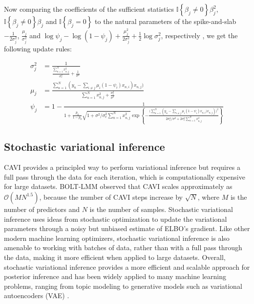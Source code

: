 %
Now comparing the coefficients of the sufficient statistics $\mathbb{I}\left\{\beta_j \ne 0\right\} \beta_j^2$, $\mathbb{I}\left\{\beta_j \ne 0\right\} \beta_j$ and $\mathbb{I}\left\{\beta_j = 0\right\}$ to the natural parameters of the spike-and-slab $-\frac{1}{2\sigma_j^2}$, $\frac{\mu_j}{\sigma_j^2}$ and $\log \psi_j - \log (1-\psi_j) + \frac{\mu_j^2}{2\sigma_j^2} + \frac{1}{2}\log \sigma_j^2$, respectively \cite{spence2020flexible}, we get the following update rules:

\begin{align}
    \sigma_j^2 &= \frac{1}{\frac{\sum_{n=1}^N x^2_{n,j}}{ \sigma_e^2} + \frac{1}{\sigma^2}} \nonumber \\
    \mu_j &= \frac{\sum_{n=1}^N (y_n - \sum_{i \ne j} \mu_i (1- \psi_i) x_{n,i}) x_{n,j})}{\sum_{n=1}^N x^2_{n,j} + \frac{\sigma_e^2}{\sigma^2}} \nonumber \\
    \psi_j &= 1 - \frac{1}{1 + \frac{p_0}{1-p_0}\sqrt{1 + \sigma^2 / \sigma_e^2 \sum_{n=1}^N x^2_{n,j} }  \exp\left\{ - \frac{\Big( \sum_{n=1}^N \left( y_n - \sum_{i \ne j} \mu_i (1- \psi_i) x_{n,i}) x_{n,j} \right) \Big)^2}{2\sigma_e^4/ \sigma^2 + 2\sigma_e^2\sum_{n=1}^N x^2_{n,j}}\right\}}
\label{eq:cavi_2_update_psi}
\end{align}

\subsection{Stochastic variational inference}
\label{sec:ch4-theory-svi}
%
CAVI provides a principled way to perform variational inference but requires a full pass through the data for each iteration, which is computationally expensive for large datasets.
%
BOLT-LMM \cite{loh2015efficient} \cite{loh2018mixed} observed that CAVI scales approximately as $\mathcal{O}(MN^{1.5})$, because the number of CAVI steps increase by $\sqrt{N}$, where $M$ is the number of predictors and $N$ is the number of samples.
%
Stochastic variational inference \cite{hoffman2013stochastic} uses ideas from stochastic optimization \cite{robbins1951stochastic} to update the variational parameters through a noisy but unbiased estimate of ELBO's gradient.
%
Like other modern machine learning optimizers, stochastic variational inference is also amenable to working with batches of data, rather than with a full pass through the data, making it more efficient when applied to large datasets.
%
Overall, stochastic variational inference provides a more efficient and scalable approach for posterior inference and has been widely applied to many machine learning problems, ranging from topic modeling \cite{hoffman2013stochastic} to generative models such as variational autoencoders (VAE) \cite{kingma2013auto}.
%

